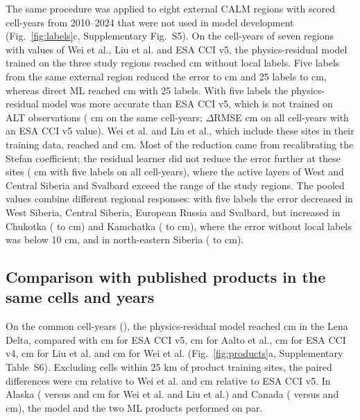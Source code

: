 The same procedure was applied to eight external CALM regions with \nftScoredRows{} scored cell-years from 2010--2024 that were not used in model development (Fig.~\ref{fig:labels}c, Supplementary Fig.~S5). On the \nftrows{} cell-years of seven regions with values of Wei et al., Liu et al. and ESA CCI v5, the physics-residual model trained on the three study regions reached \nftAllRszero{} cm without local labels. Five labels from the same external region reduced the error to \nftAllRsfive{} cm and 25 labels to \nftAllRstwfive{} cm, whereas direct ML reached \nftAllDstwfive{} cm with 25 labels. With five labels the physics-residual model was more accurate than ESA CCI v5, which is not trained on ALT observations (\nftAllCcifivezero{} cm on the same \nftrows{} cell-years; $\Delta$RMSE \nftdRsCcifivefive{} cm on all \nftdCciRows{} cell-years with an ESA CCI v5 value). Wei et al. and Liu et al., which include these sites in their training data, reached \nftAllWeizero{} and \nftAllLiuzero{} cm. Most of the reduction came from recalibrating the Stefan coefficient; the residual learner did not reduce the error further at these sites (\nftdRsPnfive{} cm with five labels on all \nftScoredRows{} cell-years), where the active layers of West and Central Siberia and Svalbard exceed the range of the study regions. The pooled values combine different regional responses: with five labels the error decreased in West Siberia, Central Siberia, European Russia and Svalbard, but increased in Chukotka (\nftChRszero{} to \nftChRsfive{} cm) and Kamchatka (\nftKaRszero{} to \nftKaRsfive{} cm), where the error without local labels was below 10 cm, and in north-eastern Siberia (\nftNsRszero{} to \nftNsRsfive{} cm).

\subsection{Comparison with published products in the same cells and years}
On the common cell-years (\nyrscc), the physics-residual model reached \nccLeRoall{} cm in the Lena Delta, compared with \nccLeCcifiveall{} cm for ESA CCI v5, \nccLeAaltoall{} cm for Aalto et al., \nccLeCcifourall{} cm for ESA CCI v4, \nccLeLiuall{} cm for Liu et al. and \nccLeWeiall{} cm for Wei et al. (Fig.~\ref{fig:products}a, Supplementary Table~S6). Excluding cells within 25 km of product training sites, the paired differences were \ndprodLeweiRomask{} cm relative to Wei et al. and \ndprodLeccifiveRomask{} cm relative to ESA CCI v5. In Alaska (\nccAkRoall{} versus \nccAkWeiall{} and \nccAkLiuall{} cm for Wei et al. and Liu et al.) and Canada (\nccCaRoall{} versus \nccCaWeiall{} and \nccCaLiuall{} cm), the model and the two ML products performed on par.

